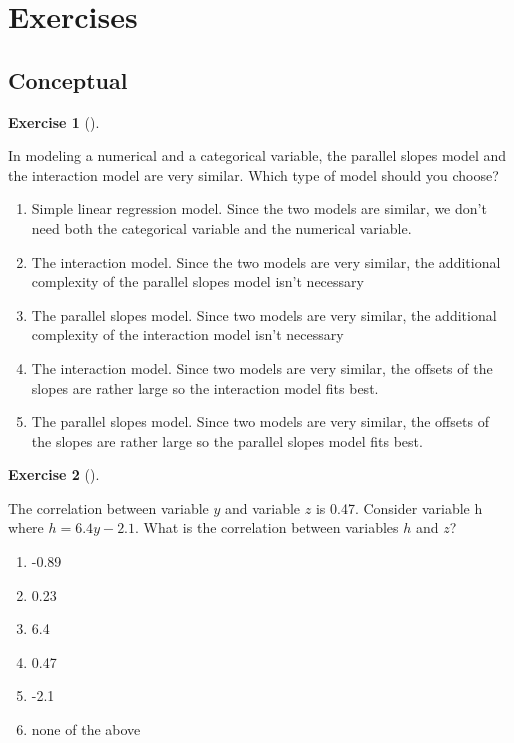 \documentclass[
  letterpaper,
  DIV=11,
  numbers=noendperiod]{scrreprt}
\providecommand{\tightlist}{%
  \setlength{\itemsep}{0pt}\setlength{\parskip}{0pt}}\usepackage{longtable,booktabs,array}
\theoremstyle{definition}
\newtheorem{exercise}{Exercise}[chapter]
\theoremstyle{remark}
\begin{document}
\hypertarget{sec-ex06}{%
\section{Exercises}\label{sec-ex06}}

\hypertarget{sec-ex06-conceptual}{%
\subsection{Conceptual}\label{sec-ex06-conceptual}}

\leavevmode{}%
\begin{exercise}[]\label{exr-ch06-c01}

In modeling a numerical and a categorical variable, the parallel slopes
model and the interaction model are very similar. Which type of model
should you choose?

\begin{enumerate}
\def\labelenumi{\alph{enumi})}
\tightlist
\item
  Simple linear regression model. Since the two models are similar, we
  don't need both the categorical variable and the numerical variable.
\item
  The interaction model. Since the two models are very similar, the
  additional complexity of the parallel slopes model isn't necessary
\item
  The parallel slopes model. Since two models are very similar, the
  additional complexity of the interaction model isn't necessary
\item
  The interaction model. Since two models are very similar, the offsets
  of the slopes are rather large so the interaction model fits best.
\item
  The parallel slopes model. Since two models are very similar, the
  offsets of the slopes are rather large so the parallel slopes model
  fits best.
\end{enumerate}

\end{exercise}

\leavevmode{}%
\begin{exercise}[]\label{exr-ch06-c02}

The correlation between variable \(y\) and variable \(z\) is 0.47.
Consider variable h where \(h = 6.4y - 2.1\). What is the correlation
between variables \(h\) and \(z\)?

\begin{enumerate}
\def\labelenumi{\alph{enumi})}
\tightlist
\item
  -0.89
\item
  0.23
\item
  6.4
\item
  0.47
\item
  -2.1
\item
  none of the above
\end{enumerate}

\end{exercise}
\end{document}
